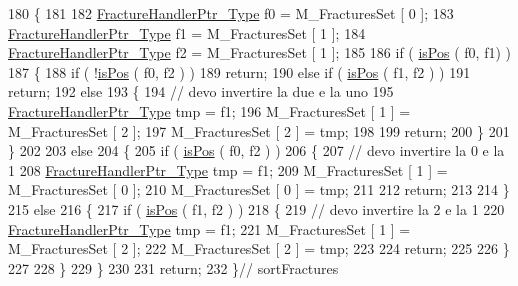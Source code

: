 \begin{DoxyCode}
180 \{
181 
182     \hyperlink{FractureHandler_8h_af23fb7a30aaff864bd42587af4f1e78a}{FractureHandlerPtr\_Type} f0 = M\_FracturesSet [ 0 ];
183     \hyperlink{FractureHandler_8h_af23fb7a30aaff864bd42587af4f1e78a}{FractureHandlerPtr\_Type} f1 = M\_FracturesSet [ 1 ];
184     \hyperlink{FractureHandler_8h_af23fb7a30aaff864bd42587af4f1e78a}{FractureHandlerPtr\_Type} f2 = M\_FracturesSet [ 1 ];
185     
186     \textcolor{keywordflow}{if} ( \hyperlink{classIntersection_a9acd54dacf9de3c21fb37df24cb47d06}{isPos} ( f0, f1) )
187     \{   
188         \textcolor{keywordflow}{if} ( !\hyperlink{classIntersection_a9acd54dacf9de3c21fb37df24cb47d06}{isPos} ( f0, f2 ) )
189             \textcolor{keywordflow}{return};
190         \textcolor{keywordflow}{else} \textcolor{keywordflow}{if} ( \hyperlink{classIntersection_a9acd54dacf9de3c21fb37df24cb47d06}{isPos} ( f1, f2 ) )
191             \textcolor{keywordflow}{return};
192         \textcolor{keywordflow}{else}
193         \{   
194             \textcolor{comment}{// devo invertire la due e la uno}
195             \hyperlink{FractureHandler_8h_af23fb7a30aaff864bd42587af4f1e78a}{FractureHandlerPtr\_Type} tmp = f1;
196             M\_FracturesSet [ 1 ] = M\_FracturesSet [ 2 ];
197             M\_FracturesSet [ 2 ] = tmp;
198             
199             \textcolor{keywordflow}{return};
200         \}
201     \}
202         
203     \textcolor{keywordflow}{else} 
204     \{   
205         \textcolor{keywordflow}{if} ( \hyperlink{classIntersection_a9acd54dacf9de3c21fb37df24cb47d06}{isPos} ( f0, f2 ) )
206         \{
207             \textcolor{comment}{// devo invertire la 0 e la 1}
208             \hyperlink{FractureHandler_8h_af23fb7a30aaff864bd42587af4f1e78a}{FractureHandlerPtr\_Type} tmp = f1;
209             M\_FracturesSet [ 1 ] = M\_FracturesSet [ 0 ];
210             M\_FracturesSet [ 0 ] = tmp;
211             
212             \textcolor{keywordflow}{return};
213 
214         \}
215         \textcolor{keywordflow}{else}
216         \{
217             \textcolor{keywordflow}{if} ( \hyperlink{classIntersection_a9acd54dacf9de3c21fb37df24cb47d06}{isPos} ( f1, f2 ) )
218             \{   
219                 \textcolor{comment}{// devo invertire la 2 e la 1}
220                 \hyperlink{FractureHandler_8h_af23fb7a30aaff864bd42587af4f1e78a}{FractureHandlerPtr\_Type} tmp = f1;
221                 M\_FracturesSet [ 1 ] = M\_FracturesSet [ 2 ];
222                 M\_FracturesSet [ 2 ] = tmp;
223                 
224                 \textcolor{keywordflow}{return};
225 
226             \}
227 
228         \}
229     \}
230     
231     \textcolor{keywordflow}{return};
232 \}\textcolor{comment}{// sortFractures}
\end{DoxyCode}


